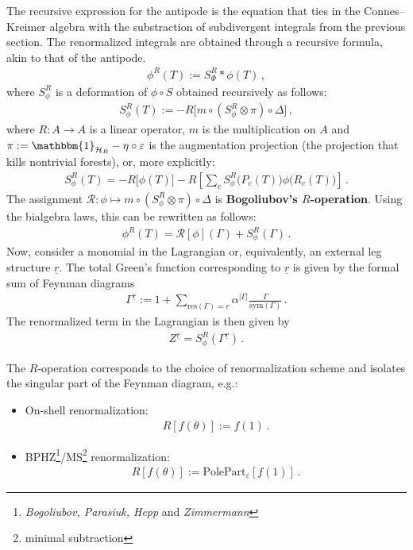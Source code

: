     The recursive expression for the antipode is the equation that ties in the Connes--Kreimer algebra with the substraction of subdivergent integrals from the previous section. The renormalized integrals are obtained through a recursive formula, akin to that of the antipode.
    \begin{gather}
        \phi^R(T) := S_\Phi^R\ast\phi(T)\,,
    \end{gather}
    where $S_\phi^R$ is a deformation of $\phi\circ S$ obtained recursively as follows:
    \begin{gather}
        S_\phi^R(T) := -R\bigl[m\circ(S_\phi^R\otimes\pi)\circ\Delta\bigr]\,,
    \end{gather}
    where $R:A\rightarrow A$ is a linear operator, $m$ is the multiplication on $A$ and $\pi:=\mathbbm{1}_{\mathcal{H}_R}-\eta\circ\varepsilon$ is the augmentation projection (the projection that kills nontrivial forests), or, more explicitly:
    \begin{gather}
        S_\phi^R(T) = -R\bigl[\phi(T)\bigr] - R\left[\sum_cS_\phi^R\bigl(P_c(T)\bigr)\phi\bigl(R_c(T)\bigr)\right]\,.
    \end{gather}
    The assignment $\mathcal{R}:\phi\mapsto m\circ(S_\phi^R\otimes\pi)\circ\Delta$ is \textbf{Bogoliubov's $R$-operation}. Using the bialgebra laws, this can be rewritten as follows:
    \begin{gather}
        \phi^R(T) = \mathcal{R}[\phi](\Gamma)+S_\phi^R(\Gamma)\,.
    \end{gather}
    Now, consider a monomial in the Lagrangian or, equivalently, an external leg structure $\underline{r}$. The total Green's function corresponding to $\underline{r}$ is given by the formal sum of Feynman diagrams
    \begin{gather}
        \Gamma^{\underline{r}} := 1 + \sum_{\mathrm{res}(\Gamma)=\underline{r}}\alpha^{|\Gamma|}\frac{\Gamma}{\mathrm{sym}(\Gamma)}\,.
    \end{gather}
    The renormalized term in the Lagrangian is then given by
    \begin{gather}
        Z^{\underline{r}} = S_\phi^R(\Gamma^{\underline{r}})\,.
    \end{gather}
    
    The $R$-operation corresponds to the choice of renormalization scheme and isolates the singular part of the Feynman diagram, e.g.:
    \begin{itemize}
        \item On-shell renormalization:
        \begin{gather}
            R[f(\theta)] := f(1)\,.
        \end{gather}
        \item BPHZ\footnote{\textit{Bogoliubov, Parasiuk, Hepp} and \textit{Zimmermann}}/MS\footnote{minimal subtraction} renormalization:
        \begin{gather}
            R[f(\theta)] := \mathrm{PolePart}_\varepsilon[f(1)]\,.
        \end{gather}
    \end{itemize}


